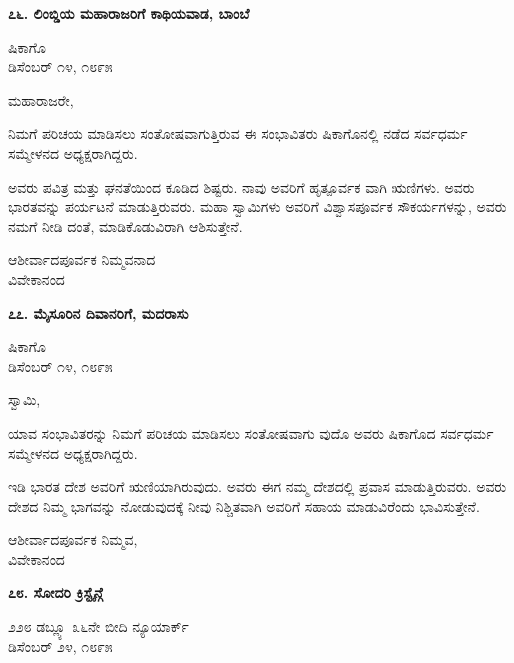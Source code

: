 \begin{center}
\textbf{೭೬. ಲಿಂಬ್ಡಿಯ ಮಹಾರಾಜರಿಗೆ ಕಾಥಿಯವಾಡ, ಬಾಂಬೆ}
\end{center}

\begin{flushright}
ಷಿಕಾಗೊ\\ಡಿಸೆಂಬರ್ ೧೪, ೧೮೯೫
\end{flushright}

ಮಹಾರಾಜರೇ,

ನಿಮಗೆ ಪರಿಚಯ ಮಾಡಿಸಲು ಸಂತೋಷವಾಗುತ್ತಿರುವ ಈ ಸಂಭಾವಿತರು ಷಿಕಾಗೊನಲ್ಲಿ ನಡೆದ ಸರ್ವಧರ್ಮ ಸಮ್ಮೇಳನದ ಅಧ್ಯಕ್ಷರಾಗಿದ್ದರು.

ಅವರು ಪವಿತ್ರ ಮತ್ತು ಘನತೆಯಿಂದ ಕೂಡಿದ ಶಿಷ್ಟರು. ನಾವು ಅವರಿಗೆ ಹೃತ್ಪೂರ್ವಕ ವಾಗಿ ಋಣಿಗಳು. ಅವರು ಭಾರತವನ್ನು ಪರ್ಯಟನೆ ಮಾಡುತ್ತಿರುವರು. ಮಹಾ ಸ್ವಾಮಿಗಳು ಅವರಿಗೆ ವಿಶ್ವಾಸಪೂರ್ವಕ ಸೌಕರ್ಯಗಳನ್ನು, ಅವರು ನಮಗೆ ನೀಡಿ ದಂತೆ, ಮಾಡಿಕೊಡುವಿರಾಗಿ ಆಶಿಸುತ್ತೇನೆ.

\begin{flushright}
ಆಶೀರ್ವಾದಪೂರ್ವಕ ನಿಮ್ಮವನಾದ\\ವಿವೇಕಾನಂದ
\end{flushright}

\begin{center}
\textbf{೭೭. ಮೈಸೂರಿನ ದಿವಾನರಿಗೆ, ಮದರಾಸು}
\end{center}

\begin{flushright}
ಷಿಕಾಗೊ\\ಡಿಸೆಂಬರ್ ೧೪, ೧೮೯೫
\end{flushright}

ಸ್ವಾಮಿ,

ಯಾವ ಸಂಭಾವಿತರನ್ನು ನಿಮಗೆ ಪರಿಚಯ ಮಾಡಿಸಲು ಸಂತೋಷವಾಗು ವುದೊ ಅವರು ಷಿಕಾಗೊದ ಸರ್ವಧರ್ಮ ಸಮ್ಮೇಳನದ ಅಧ್ಯಕ್ಷರಾಗಿದ್ದರು.

ಇಡಿ ಭಾರತ ದೇಶ ಅವರಿಗೆ ಋಣಿಯಾಗಿರುವುದು. ಅವರು ಈಗ ನಮ್ಮ ದೇಶದಲ್ಲಿ ಪ್ರವಾಸ ಮಾಡುತ್ತಿರುವರು. ಅವರು ದೇಶದ ನಿಮ್ಮ ಭಾಗವನ್ನು ನೋಡುವುದಕ್ಕೆ ನೀವು ನಿಶ್ಚಿತವಾಗಿ ಅವರಿಗೆ ಸಹಾಯ ಮಾಡುವಿರೆಂದು ಭಾವಿಸುತ್ತೇನೆ.

\begin{flushright}
ಆಶೀರ್ವಾದಪೂರ್ವಕ ನಿಮ್ಮವ,\\ವಿವೇಕಾನಂದ
\end{flushright}

\begin{center}
\textbf{೭೮. ಸೋದರಿ ಕ್ರಿಸ್ಟೈನ್ಗೆ}
\end{center}

\begin{flushright}
೨೨೮ ಡಬ್ಲ್ಯೂ ೩೬ನೇ ಬೀದಿ ನ್ಯೂಯಾರ್ಕ್\\ಡಿಸೆಂಬರ್ ೨೪, ೧೮೯೫
\end{flushright}


